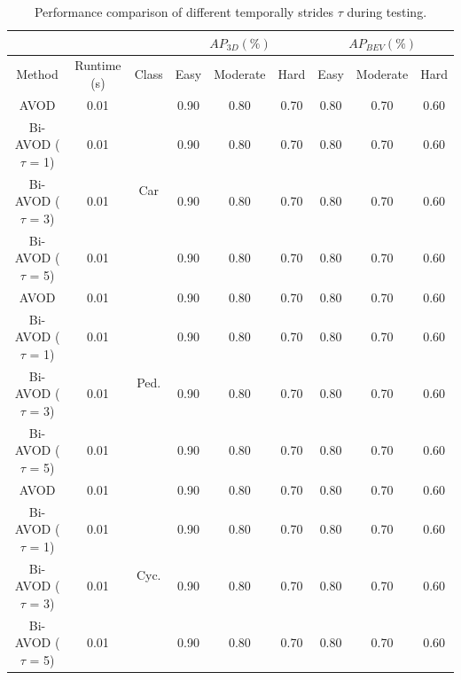 \documentclass{bmvc2k}
\begin{document}
\begin{table}[]\centering
	\footnotesize
	\begin{tabular}{ccccccccc}
		&   		   &  											& \multicolumn{3}{c}{$AP_{3D}(\%)$}  		 & \multicolumn{3}{c}{$AP_{BEV}(\%)$} \\ \toprule[1.5pt]
		Method                & Runtime (s) & \multicolumn{1}{c|}{Class}  				& Easy & Moderate & \multicolumn{1}{c|}{Hard} & Easy    & Moderate    & Hard    \\ \midrule
		AVOD                  & 0.01        & \multicolumn{1}{c|}{\multirow{4}{*}{Car}}  & 0.90 & 0.80     & \multicolumn{1}{c|}{0.70} & 0.80    & 0.70        & 0.60    \\
		Bi-AVOD ($\tau$ = 1)  & 0.01        & \multicolumn{1}{c|}{}                      & 0.90 & 0.80     & \multicolumn{1}{c|}{0.70} & 0.80    & 0.70        & 0.60    \\
		Bi-AVOD ($\tau$ = 3)  & 0.01        & \multicolumn{1}{c|}{}                      & 0.90 & 0.80     & \multicolumn{1}{c|}{0.70} & 0.80    & 0.70        & 0.60    \\
		Bi-AVOD ($\tau$ = 5)  & 0.01        & \multicolumn{1}{c|}{}                      & 0.90 & 0.80     & \multicolumn{1}{c|}{0.70} & 0.80    & 0.70        & 0.60    \\ \midrule
		AVOD                  & 0.01        & \multicolumn{1}{c|}{\multirow{4}{*}{Ped.}} & 0.90 & 0.80     & \multicolumn{1}{c|}{0.70} & 0.80    & 0.70        & 0.60    \\
		Bi-AVOD ($\tau$ = 1)  & 0.01        & \multicolumn{1}{c|}{}                      & 0.90 & 0.80     & \multicolumn{1}{c|}{0.70} & 0.80    & 0.70        & 0.60    \\
		Bi-AVOD ($\tau$ = 3)  & 0.01        & \multicolumn{1}{c|}{}                      & 0.90 & 0.80     & \multicolumn{1}{c|}{0.70} & 0.80    & 0.70        & 0.60    \\
		Bi-AVOD ($\tau$ = 5)  & 0.01        & \multicolumn{1}{c|}{}                      & 0.90 & 0.80     & \multicolumn{1}{c|}{0.70} & 0.80    & 0.70        & 0.60    \\ \midrule
		AVOD                  & 0.01        & \multicolumn{1}{c|}{\multirow{4}{*}{Cyc.}} & 0.90 & 0.80     & \multicolumn{1}{c|}{0.70} & 0.80    & 0.70        & 0.60    \\
		Bi-AVOD ($\tau$ = 1)  & 0.01        & \multicolumn{1}{c|}{}                      & 0.90 & 0.80     & \multicolumn{1}{c|}{0.70} & 0.80    & 0.70        & 0.60    \\
		Bi-AVOD ($\tau$ = 3)  & 0.01        & \multicolumn{1}{c|}{}                      & 0.90 & 0.80     & \multicolumn{1}{c|}{0.70} & 0.80    & 0.70        & 0.60    \\
		Bi-AVOD ($\tau$ = 5)  & 0.01        & \multicolumn{1}{c|}{}                      & 0.90 & 0.80     & \multicolumn{1}{c|}{0.70} & 0.80    & 0.70        & 0.60    \\
		\bottomrule[1.5pt]
	\end{tabular}
	\setlength{\abovecaptionskip}{1pt}
	\caption{Performance comparison of different temporally strides $\tau$ during testing.}
	\label{table:result_streaming}
\end{table}
\end{document}
